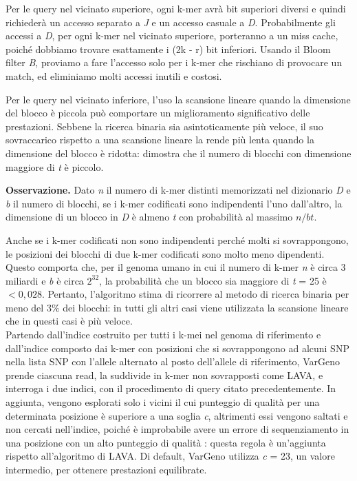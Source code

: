 \documentclass[../main.tex]{subfiles}
\begin{document}
Per le query nel vicinato superiore, ogni k-mer avrà bit superiori diversi e quindi richiederà un accesso separato a \textit{J} e un accesso casuale a \textit{D}. Probabilmente gli accessi a \textit{D}, per ogni k-mer nel vicinato superiore, porteranno a un miss cache, poiché dobbiamo trovare esattamente i (2k - r) bit inferiori. Usando il Bloom filter \textit{B}, proviamo a fare l'accesso solo per i k-mer che rischiano di provocare un match, ed eliminiamo molti accessi inutili e costosi.

Per le query nel vicinato inferiore, l'uso la scansione lineare quando la dimensione del blocco è piccola può comportare un miglioramento significativo delle prestazioni. Sebbene la ricerca binaria sia asintoticamente più veloce, il suo sovraccarico rispetto a una scansione lineare la rende più lenta quando la dimensione del blocco è ridotta: \cite{sun-medvedev2018vargeno} dimostra che il numero di blocchi con dimensione maggiore di \textit{t} è piccolo. 

\textbf{Osservazione.} Dato \textit{n} il numero di k-mer distinti memorizzati nel dizionario \textit{D} e \textit{b} il numero di blocchi, se i k-mer codificati sono indipendenti l'uno dall'altro, la dimensione di un blocco in \textit{D} è almeno \textit{t} con probabilità al massimo $n/bt$. 

Anche se i k-mer codificati non sono indipendenti perché molti si sovrappongono, le posizioni dei blocchi di due k-mer codificati sono molto meno dipendenti.  Questo comporta che, per il genoma umano in cui il numero di k-mer \textit{n} è circa 3 miliardi e \textit{b} è circa $2^{32}$, la probabilità che un blocco sia maggiore di \textit{t} = 25 è $<0,028$. Pertanto, l'algoritmo stima di ricorrere al metodo di ricerca binaria per meno del 3\% dei blocchi: in tutti gli altri casi viene utilizzata la scansione lineare che in questi casi è più veloce.\\

Partendo dall'indice costruito per tutti i k-mei nel genoma di riferimento e dall'indice composto dai k-mer con posizioni che si sovrappongono ad alcuni SNP nella lista SNP con l'allele alternato al posto dell'allele di riferimento, VarGeno prende ciascuna read, la suddivide in k-mer non sovrapposti come LAVA, e interroga i due indici, con il procedimento di query citato precedentemente. In aggiunta, vengono esplorati solo i vicini il cui punteggio di qualità per una determinata posizione è superiore a una soglia \textit{c}, altrimenti essi vengono saltati e non cercati nell'indice, poiché è improbabile avere un errore di sequenziamento in una posizione con un alto punteggio di qualità \cite{sun-medvedev2018vargeno}: questa regola è un'aggiunta rispetto all'algoritmo di LAVA. Di default, VarGeno utilizza \textit{c} = 23, un valore intermedio, per ottenere prestazioni equilibrate.
\end{document}
